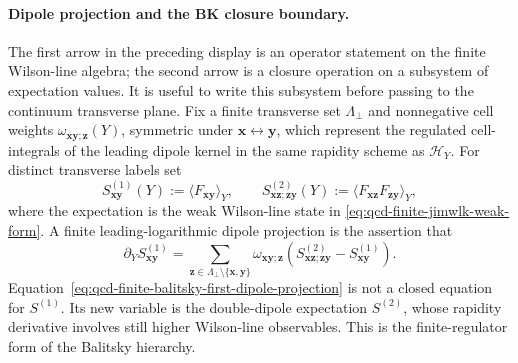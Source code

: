 \paragraph{Dipole projection and the BK closure boundary.}
The first arrow in the preceding display is an operator statement on the
finite Wilson-line algebra; the second arrow is a closure operation on a
subsystem of expectation values.  It is useful to write this subsystem before
passing to the continuum transverse plane.  Fix a finite transverse set
\(\Lambda_\perp\) and nonnegative cell weights
\(\omega_{\mathbf x\mathbf y;\mathbf z}(Y)\), symmetric under
\(\mathbf x\leftrightarrow\mathbf y\), which represent the regulated
cell-integrals of the leading dipole kernel in the same rapidity scheme as
\(\mathcal H_Y\).  For distinct transverse labels set
\[
  S_{\mathbf x\mathbf y}^{(1)}(Y)
  :=
  \langle F_{\mathbf x\mathbf y}\rangle_Y,
  \qquad
  S_{\mathbf x\mathbf z;\mathbf z\mathbf y}^{(2)}(Y)
  :=
  \langle
    F_{\mathbf x\mathbf z}F_{\mathbf z\mathbf y}
  \rangle_Y ,
\]
where the expectation is the weak Wilson-line state in
\eqref{eq:qcd-finite-jimwlk-weak-form}.  A finite leading-logarithmic dipole
projection is the assertion that
\begin{equation}
  \partial_Y S_{\mathbf x\mathbf y}^{(1)}
  =
  \sum_{\mathbf z\in\Lambda_\perp\setminus\{\mathbf x,\mathbf y\}}
  \omega_{\mathbf x\mathbf y;\mathbf z}
  \left(
    S_{\mathbf x\mathbf z;\mathbf z\mathbf y}^{(2)}
    -
    S_{\mathbf x\mathbf y}^{(1)}
  \right).
  \label{eq:qcd-finite-balitsky-first-dipole-projection}
\end{equation}
Equation~\eqref{eq:qcd-finite-balitsky-first-dipole-projection} is not a
closed equation for \(S^{(1)}\).  Its new variable is the double-dipole
expectation \(S^{(2)}\), whose rapidity derivative involves still higher
Wilson-line observables.  This is the finite-regulator form of the Balitsky
hierarchy.

